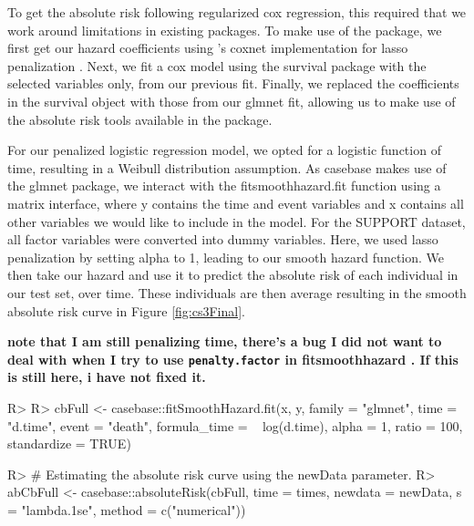 \documentclass[
]{jss}
\begin{document}
To get the absolute risk following regularized cox regression, this
required that we work around limitations in existing packages. To make
use of the  package, we first get our hazard coefficients
using 's coxnet implementation for lasso penalization
\citep{regpathcox}. Next, we fit a cox model using the survival package
with the selected variables only, from our previous fit. Finally, we
replaced the coefficients in the survival object with those from our
glmnet fit, allowing us to make use of the absolute risk tools available
in the  package.

For our penalized logistic regression model, we opted for a logistic
function of time, resulting in a Weibull distribution assumption. As
casebase makes use of the glmnet package, we interact with the
fitsmoothhazard.fit function using a matrix interface, where y contains
the time and event variables and x contains all other variables we would
like to include in the model. For the SUPPORT dataset, all factor
variables were converted into dummy variables. Here, we used lasso
penalization by setting alpha to 1, leading to our smooth hazard
function. We then take our hazard and use it to predict the absolute
risk of each individual in our test set, over time. These individuals
are then average resulting in the smooth absolute risk curve in Figure
\ref{fig:cs3Final}.

\textbf{note that I am still penalizing time, there's a bug I did not
want to deal with when I try to use \texttt{penalty.factor} in
fitsmoothhazard . If this is still here, i have not fixed it.}

\begin{CodeChunk}

\begin{CodeInput}
R> 
R> cbFull <- casebase::fitSmoothHazard.fit(x, y, family = "glmnet", time = "d.time", event = "death", formula_time = ~ log(d.time), alpha = 1, ratio = 100, standardize = TRUE)
\end{CodeInput}
\end{CodeChunk}

\begin{CodeChunk}

\begin{CodeInput}
R> # Estimating the absolute risk curve using the newData parameter.
R> abCbFull <- casebase::absoluteRisk(cbFull, time = times, newdata = newData, s = "lambda.1se", method = c("numerical"))
\end{CodeInput}
\end{CodeChunk}
\end{document}
